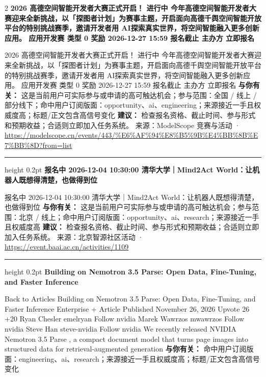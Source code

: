 \documentclass[10.5pt]{ctexart}
\begin{document}
\begin{multicols}{2}
{\large\bfseries 2026 高德空间智能开发者大赛正式开启！ 进行中 今年高德空间智能开发者大赛迎来全新挑战，以「探图者计划」为赛事主题，开启面向高德千舆空间智能开放平台的特别挑战赛季，邀请开发者用 AI探索真实世界，将空间智能融入更多创新应用。 应用开发赛 类型 0 奖励 2026-12-27 15:59 报名截止 主办方 立即报名}\par
2026 高德空间智能开发者大赛正式开启！ 进行中 今年高德空间智能开发者大赛迎来全新挑战，以「探图者计划」为赛事主题，开启面向高德千舆空间智能开放平台的特别挑战赛季，邀请开发者用 AI探索真实世界，将空间智能融入更多创新应用。 应用开发赛 类型 0 奖励 2026-12-27 15:59 报名截止 主办方 立即报名
\textbf{与你有关：} 这是当前用户可实际参与或申请的高可触达机会；参与范围：全国 / 线上 / 部分线下；命中用户订阅版面：opportunity、ai、engineering；来源接近一手且权威度高；标题/正文包含高信号变化
\textbf{建议：} 检查报名资格、截止时间、参与形式和预期收益；合适则立即加入任务系统。
{\footnotesize\color{ormuted} 来源：ModelScope 竞赛与活动 · \url{https://modelscope.cn/events/443/%E6%AF%94%E8%B5%9B%E4%BB%8B%E7%BB%8D?from=list}}
\vspace{2mm}
\hrule height 0.2pt
\vspace{2mm}
{\large\bfseries 报名中 2026-12-04 10:30:00 清华大学｜Mind2Act World：让机器人既想得清楚，也做得到位}\par
报名中 2026-12-04 10:30:00 清华大学｜Mind2Act World：让机器人既想得清楚，也做得到位
\textbf{与你有关：} 这是当前用户可实际参与或申请的高可触达机会；参与范围：北京 / 线上；命中用户订阅版面：opportunity、ai、research；来源接近一手且权威度高
\textbf{建议：} 检查报名资格、截止时间、参与形式和预期收益；合适则立即加入任务系统。
{\footnotesize\color{ormuted} 来源：北京智源社区活动 · \url{https://event.baai.ac.cn/activities/1109}}
\vspace{2mm}
\hrule height 0.2pt
\vspace{2mm}
{\large\bfseries Building on Nemotron 3.5 Parse: Open Data, Fine-Tuning, and Faster Inference}\par
Back to Articles Building on Nemotron 3.5 Parse: Open Data, Fine-Tuning, and Faster Inference Enterprise + Article Published November 26, 2026 Upvote 26 +20 Ryan Chesler emelryan Follow nvidia Marek Wawrzos mwawrzos Follow nvidia Steve Han steve-nvidia Follow nvidia We recently released NVIDIA Nemotron 3.5 Parse , a compact document model that turns page images into structured data for retrieval-augmented generation 
\textbf{与你有关：} 命中用户订阅版面：engineering、ai、research；来源接近一手且权威度高；标题/正文包含高信号变化

\end{multicols}
\end{document}
